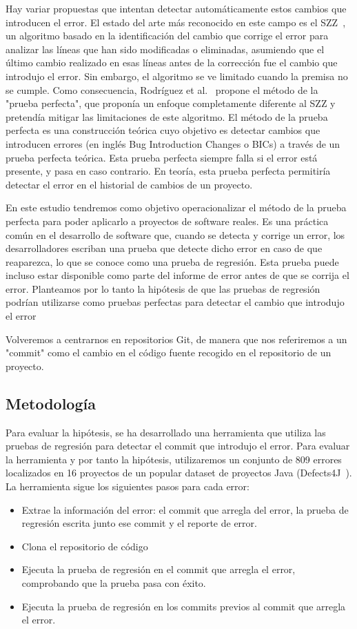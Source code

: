Hay variar propuestas que intentan detectar automáticamente estos cambios que introducen el error. 
El estado del arte más reconocido en este campo es el SZZ~\cite{sliwerski2005changes}, un algoritmo basado en la identificación del cambio que corrige el error para analizar las líneas que han sido modificadas o eliminadas, asumiendo que el último cambio realizado en esas líneas antes de la corrección fue el cambio que introdujo el error.
Sin embargo, el algoritmo se ve limitado cuando la premisa no se cumple.
Como consecuencia, Rodríguez et al.~\cite{rodriguez2020bugs} propone el método de la "prueba perfecta", que proponía un enfoque completamente diferente al SZZ y pretendía mitigar las limitaciones de este algoritmo. 
El método de la prueba perfecta es una construcción teórica cuyo objetivo es detectar cambios que introducen errores (en inglés
Bug Introduction Changes o BICs) a través de un prueba perfecta teórica.
Esta prueba perfecta siempre falla si el error está presente, y pasa en caso contrario. En teoría, esta prueba perfecta permitiría detectar el error en el historial de cambios de un proyecto.

En este estudio tendremos como objetivo operacionalizar el método de la prueba perfecta para poder aplicarlo a proyectos de software reales.
Es una práctica común en el desarrollo de software que, cuando se detecta y corrige un error, los desarrolladores escriban una
prueba que detecte dicho error en caso de que reaparezca, lo que se conoce como una prueba de regresión. 
Esta prueba puede incluso estar disponible como parte del informe de error antes de que se corrija el error.
Planteamos por lo tanto la hipótesis de que las pruebas de regresión podrían utilizarse como pruebas perfectas para detectar el cambio que introdujo el error

Volveremos a centrarnos en repositorios Git, de manera que nos referiremos a un "commit" como el cambio en el código fuente recogido en el repositorio de un proyecto.

\subsection{Metodología}

Para evaluar la hipótesis, se ha desarrollado una herramienta que utiliza las pruebas de regresión para detectar el commit que introdujo el error.
Para evaluar la herramienta y por tanto la hipótesis, utilizaremos un conjunto de 809 errores localizados en 16 proyectos de un popular dataset de proyectos Java (Defects4J~\cite{just2014defects4j}).
La herramienta sigue los siguientes pasos para cada error:
\begin{itemize}
    \item Extrae la información del error: el commit que arregla del error, la prueba de regresión escrita junto ese commit y el reporte de error.
    \item Clona el repositorio de código
    \item Ejecuta la prueba de regresión en el commit que arregla el error, comprobando que la prueba pasa con éxito.
    \item Ejecuta la prueba de regresión en los commits previos al commit que arregla el error. 
\end{itemize}

